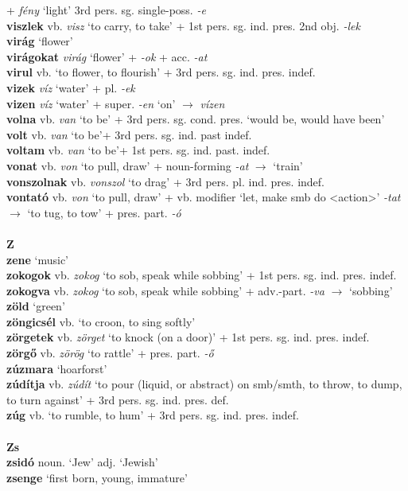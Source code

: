 \documentclass[11pt]{article}
\begin{document}
+ \emph{fény} `light' 3rd
pers. sg. single\hyp{}poss. \emph{-e} \\
\textbf{viszlek} vb. \emph{visz} `to carry, to take' + 1st
pers. sg. ind. pres. 2nd obj. \emph{-lek} \\
\textbf{virág} `flower' \\
\textbf{virágokat} \emph{virág} `flower' + \emph{-ok} +
acc. \emph{-at} \\
\textbf{virul} vb. `to flower, to flourish' + 3rd
pers. sg. ind. pres. indef. \\
\textbf{vizek} \emph{víz} `water' + pl. \emph{-ek} \\
\textbf{vizen} \emph{víz} `water' + super. \emph{-en} `on'
$\rightarrow$ \emph{vízen} \\
\textbf{volna} vb. \emph{van} `to be' + 3rd
pers. sg. cond. pres. `would be, would have been' \\
\textbf{volt} vb. \emph{van} `to be'+ 3rd pers. sg. ind. past
indef. \\
\textbf{voltam} vb. \emph{van} `to be'+ 1st
pers. sg. ind. past. indef. \\
\textbf{vonat} vb. \emph{von} `to pull, draw' +
noun\hyp{}forming \emph{-at} $\rightarrow$ `train' \\
\textbf{vonszolnak} vb. \emph{vonszol} `to drag' + 3rd
pers. pl. ind. pres. indef. \\
\textbf{vontató} vb. \emph{von} `to pull, draw' + vb. modifier `let,
make smb do <action>' \emph{-tat} $\rightarrow$ `to tug, to tow' +
pres. part. \emph{-ó} \\
\ \\
\noindent \textbf{\large Z} \\
\textbf{zene} `music' \\
\textbf{zokogok} vb. \emph{zokog} `to sob, speak while sobbing' + 1st
pers. sg. ind. pres. indef. \\
\textbf{zokogva} vb. \emph{zokog} `to sob, speak while sobbing' +
adv.\hyp{}part. \emph{-va} $\rightarrow$ `sobbing' \\
\textbf{zöld} `green' \\
\textbf{zöngicsél} vb. `to croon, to sing softly' \\
\textbf{zörgetek} vb. \emph{zörget} `to knock (on a door)' + 1st
pers. sg. ind. pres. indef. \\
\textbf{zörgő} vb. \emph{zörög} `to rattle' + pres. part. \emph{-ő} \\
\textbf{zúzmara} `hoarforst' \\
\textbf{zúdítja} vb. \emph{zúdít} `to pour (liquid, or abstract) on
smb/smth, to throw, to dump, to turn against' + 3rd
pers. sg. ind. pres. def. \\
\textbf{zúg} vb. `to rumble, to hum' + 3rd
pers. sg. ind. pres. indef. \\
\ \\
\noindent \textbf{\large Zs} \\
\textbf{zsidó} noun. `Jew' \textbar\textbar{} adj. `Jewish' \\
\textbf{zsenge} `first born, young, immature' \\
\end{document}
